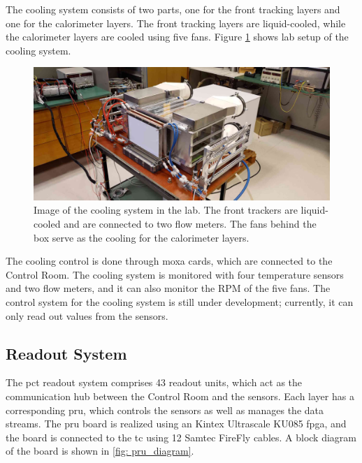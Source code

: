 \documentclass[main.tex]{subfiles}
\begin{document}
The cooling system consists of two parts, one for the front tracking layers and one for the calorimeter layers. The front tracking layers are liquid-cooled, while the calorimeter layers are cooled using five fans. Figure \ref{fig: cooling_lab} shows lab setup of the cooling system.

\begin{figure}[!ht]
    \centering
    \includegraphics[width=15cm]{images/cooling.jpg}
    \caption{Image of the cooling system in the lab. The front trackers are liquid-cooled and are connected to two flow meters. The fans behind the box serve as the cooling for the calorimeter layers.}
    \label{fig: cooling_lab}
\end{figure}
\FloatBarrier

The cooling control is done through moxa cards, which are connected to the Control Room. The cooling system is monitored with four temperature sensors and two flow meters, and it can also monitor the RPM of the five fans. The control system for the cooling system is still under development; currently, it can only read out values from the sensors.


\subsection{Readout System}

The \gls{pct} readout system comprises 43 readout units, which act as the communication hub between the Control Room and the sensors. Each layer has a corresponding \gls{pru}, which controls the sensors as well as manages the data streams. The \gls{pru} board is realized using an Kintex Ultrascale KU085 \gls{fpga}, and the board is connected to the \gls{tc} using 12 Samtec FireFly cables. A block diagram of the board is shown in \autoref{fig: pru_diagram}.
\end{document}
